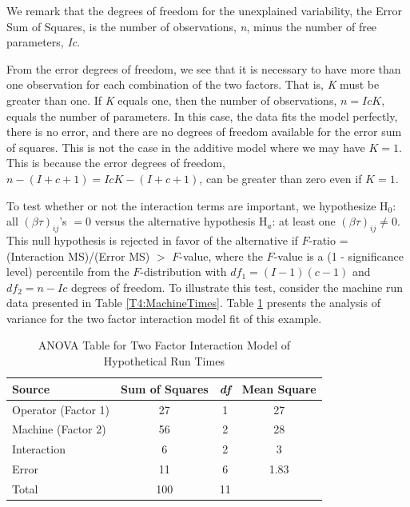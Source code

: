 \noindent We remark that the degrees of freedom for the unexplained
variability, the Error Sum of Squares, is the number of
observations, \textit{n}, minus the number of free parameters,
\textit{Ic}.

From the error degrees of freedom, we see that it is necessary to
have more than one observation for each combination of the two
factors. That is, \textit{K} must be greater than one. If \textit{K}
equals one, then the number of observations, $n=IcK$, equals the
number of parameters. In this case, the data fits the model
perfectly, there is no error, and there are no degrees of freedom
available for the error sum of squares. This is not the case in the
additive model where we may have $K=1$. This is because the error
degrees of freedom, $n-(I+c+1)=IcK-(I+c+1)$, can be greater than
zero even if $K=1$.

To test whether or not the interaction terms are important, we hypothesize H$%
_0$: all $(\beta \tau )_{ij}$'s $=0$ versus the alternative hypothesis H$%
_a$: at least one $(\beta \tau )_{ij}\neq 0$. This null hypothesis
is rejected in favor of the alternative if $F$-ratio = (Interaction
MS)/(Error MS) $>$ $F$-value, where the $F$-value is a (1 -
significance level) percentile from the $F$-distribution with
$df_1=(I-1)(c-1)$ and $df_2=n-Ic$ degrees of freedom. To illustrate
this test, consider the machine run data presented in Table
\ref{T4:MachineTimes}. Table \ref{T4:TwoFactorANOVARunTimes}
presents the analysis of variance for the two factor interaction
model fit of this example.

  \begin{center}  \begin{table}[h]
\caption{\label{T4:TwoFactorANOVARunTimes} ANOVA Table for Two
Factor Interaction Model of Hypothetical Run Times}
\begin{tabular}{lccc}
\hline Source & Sum of Squares & \textit{df} & Mean Square \\ \hline
Operator (Factor 1)      & 27  & 1  & 27 \\
Machine (Factor 2)       & 56  & 2  & 28 \\
Interaction              & 6   & 2  & 3 \\
Error                    & 11  & 6  & 1.83 \\
Total                    & 100 & 11 &\\ \hline
\end{tabular}
\end{table}  \end{center}  


